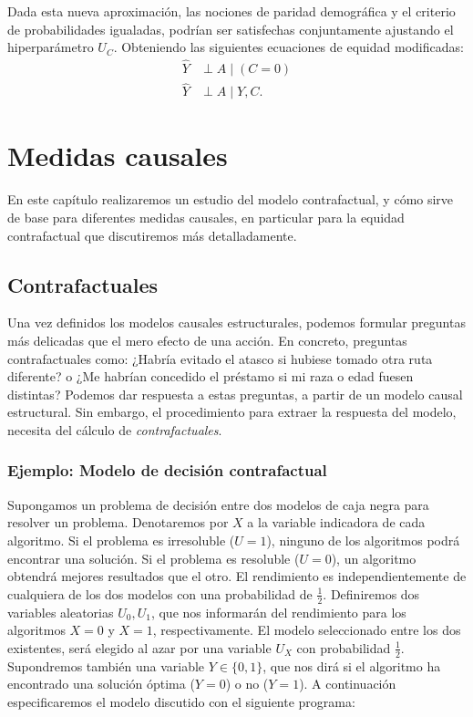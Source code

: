 \documentclass[oneside,openright,titlepage,numbers=noenddot,openany,headinclude,footinclude=true,
cleardoublepage=empty,abstractoff,BCOR=5mm,paper=a4,fontsize=12pt,main=spanish]{scrreprt}
\begin{document}
Dada esta nueva aproximación, las nociones de paridad demográfica y el criterio de probabilidades igualadas, podrían ser satisfechas conjuntamente ajustando el hiperparámetro $U_C$. Obteniendo las siguientes ecuaciones de equidad modificadas:
\begin{equation*}
    \begin{split}
        \hat{Y} &\perp A \mid (C=0)\\
        \hat{Y} &\perp A \mid Y,C.
    \end{split}
\end{equation*}

\chapter{Medidas causales} \label{ch:medidascausal}

En este capítulo realizaremos un estudio del modelo contrafactual, y cómo sirve de base para diferentes medidas causales, en particular para la equidad contrafactual que discutiremos más detalladamente. 

\section{Contrafactuales}

Una vez definidos los modelos causales estructurales, podemos formular preguntas más delicadas que el mero efecto de una acción. En concreto, preguntas contrafactuales como: ¿Habría evitado el atasco si hubiese tomado otra ruta diferente? o ¿Me habrían concedido el préstamo si mi raza o edad fuesen distintas? Podemos dar respuesta a estas preguntas, a partir de un modelo causal estructural. Sin embargo, el procedimiento para extraer la respuesta del modelo, necesita del cálculo de \textit{contrafactuales}.

\subsection{Ejemplo: Modelo de decisión contrafactual}

Supongamos un problema de decisión entre dos modelos de caja negra para resolver un problema. Denotaremos por $X$ a la variable indicadora de cada algoritmo. Si el problema es irresoluble ($U=1$), ninguno de los algoritmos podrá encontrar una solución. Si el problema es resoluble ($U=0$), un algoritmo obtendrá mejores resultados que el otro. El rendimiento es independientemente de cualquiera de los dos modelos con una probabilidad de $\frac{1}{2}$. Definiremos dos variables aleatorias $U_0, U_1$, que nos informarán del rendimiento para los algoritmos $X=0$ y $X=1$, respectivamente. El modelo seleccionado entre los dos existentes, será elegido al azar por una variable $U_X$ con probabilidad $\frac{1}{2}$. Supondremos también una variable $Y \in \{0,1\}$, que nos dirá si el algoritmo ha encontrado una solución óptima ($Y=0$) o no ($Y=1$). A continuación especificaremos el modelo discutido con el siguiente programa:
\end{document}
